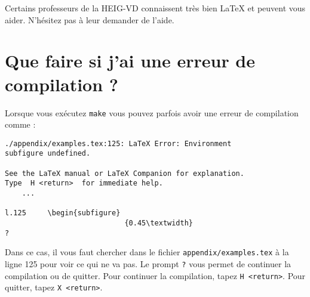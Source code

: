 Certains professeurs de la HEIG-VD connaissent très bien LaTeX et peuvent vous aider. N'hésitez pas à leur demander de l'aide.

\section{Que faire si j'ai une erreur de compilation ?}

Lorsque vous exécutez \verb!make! vous pouvez parfois avoir une erreur de compilation comme :

\begin{verbatim}
./appendix/examples.tex:125: LaTeX Error: Environment
subfigure undefined.

See the LaTeX manual or LaTeX Companion for explanation.
Type  H <return>  for immediate help.
    ...

l.125     \begin{subfigure}
                            {0.45\textwidth}
?
\end{verbatim}

Dans ce cas, il vous faut chercher dans le fichier \verb!appendix/examples.tex! à la ligne 125 pour voir ce qui ne va pas. Le prompt \verb!?! vous permet de continuer la compilation ou de quitter. Pour continuer la compilation, tapez \verb!H <return>!. Pour quitter, tapez \verb!X <return>!.